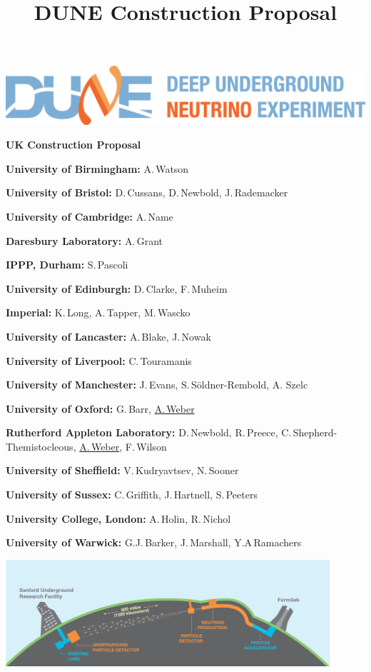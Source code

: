 
\setcounter{page}{0}

\title{DUNE Construction Proposal}

\begin{center}

\includegraphics[width=\textwidth]{figs/dune-horiz-logo-lg.png}
\vspace{1ex}

{\LARGE\bf 
UK Construction Proposal
}
\vfill

{\bf University of Birmingham:} A.\,Watson

{\bf University of Bristol:} D.\,Cussans, D.\,Newbold, J.\,Rademacker

{\bf University of Cambridge:} A.\,Name

{\bf Daresbury Laboratory:} A.\,Grant

{\bf IPPP, Durham:} S.\,Pascoli

{\bf University of Edinburgh:} D.\,Clarke, F.\,Muheim

{\bf Imperial:} K.\,Long, A.\,Tapper, M.\,Wascko

{\bf University of Lancaster:} A.\,Blake, J.\,Nowak

{\bf University of Liverpool:} C.\,Touramanis

{\bf University of Manchester:} J.\,Evans, S.\,S\"oldner-Rembold, A. Szelc

{\bf University of Oxford:} G.\,Barr, \underline{A.\,Weber}

{\bf Rutherford Appleton Laboratory:} D.\,Newbold, R.\,Preece, C.\,Shepherd-Themistocleous, \underline{A.\,Weber}, F.\,Wilson

{\bf University of Sheffield:} V.\,Kudryavtsev, N.\,Sooner

{\bf University of Sussex:} C.\,Griffith, J.\,Hartnell, S.\,Peeters

{\bf University College, London:} A.\,Holin, R.\,Nichol

{\bf University of Warwick:} G.J.\,Barker, J.\,Marshall, Y.A\,Ramachers

\vfill

\includegraphics[width=0.9\textwidth]{figs/LBNE_Graphic_061615_2016.jpg}
\end{center}
\vfill

